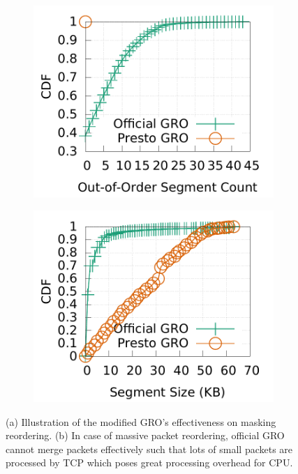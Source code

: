 \begin{figure}[t]
	\centering
	\begin{subfigure}[b]{0.225\textwidth}
                \centering
  		\includegraphics[width=\textwidth]{presto/figures/gro_effectiveness/metric1_seg_cdf_compare.pdf}
		\caption{}
		\label{gro_effectiveness_on_reordering}
	\end{subfigure}
        \begin{subfigure}[b]{0.225\textwidth}
                \centering
		\includegraphics[width=\textwidth]{presto/figures/gro_effectiveness/metric1_pktsize_cdf_compare.pdf}
        	\caption{}
		\label{gro_effectiveness_on_pktsize}
	\end{subfigure}
	\caption{(a) Illustration of the modified GRO's effectiveness on masking reordering. 
		(b) In case of massive packet reordering, official GRO cannot merge packets effectively such that lots of small
                packets are processed by TCP which poses great processing overhead for CPU.}
	\label{gro_effectiveness}
\end{figure}


